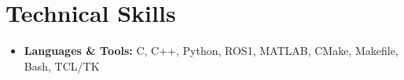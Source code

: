 \documentclass[letterpaper,11pt]{article}
\newcommand{\resumeSubHeadingListStart}{\begin{itemize}[leftmargin=0.15in, label={}]}
\newcommand{\resumeSubHeadingListEnd}{\end{itemize}}
\begin{document}


%
\section{Technical Skills}
\begin{itemize}[leftmargin=0.15in, label={}]
  \item \textbf{Languages \& Tools:} C, C++, Python, ROS1, MATLAB, CMake, Makefile, Bash, TCL/TK
\end{itemize}

 
\end{document}
